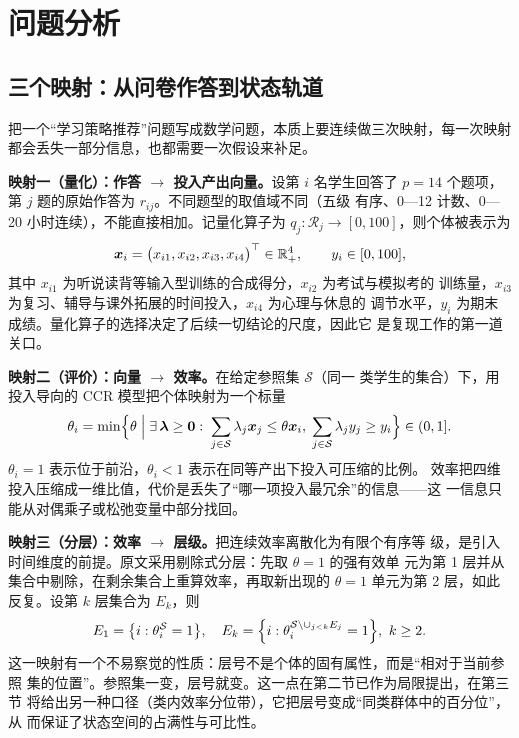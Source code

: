 \section{问题分析}

\subsection{三个映射：从问卷作答到状态轨道}

把一个“学习策略推荐”问题写成数学问题，本质上要连续做三次映射，每一次映射
都会丢失一部分信息，也都需要一次假设来补足。

\textbf{映射一（量化）：作答 $\to$ 投入产出向量。}设第 $i$ 名学生回答了
$p=14$ 个题项，第 $j$ 题的原始作答为 $r_{ij}$。不同题型的取值域不同（五级
有序、0—12 计数、0—20 小时连续），不能直接相加。记量化算子为
$q_j:\mathcal{R}_j\to[0,100]$，则个体被表示为
\begin{equation}
\bm{x}_i=\bigl(x_{i1},x_{i2},x_{i3},x_{i4}\bigr)^{\top}\in\mathbb{R}_+^4,\qquad
y_i\in[0,100],
\label{eq:map1}
\end{equation}
其中 $x_{i1}$ 为听说读背等输入型训练的合成得分，$x_{i2}$ 为考试与模拟考的
训练量，$x_{i3}$ 为复习、辅导与课外拓展的时间投入，$x_{i4}$ 为心理与休息的
调节水平，$y_i$ 为期末成绩。量化算子的选择决定了后续一切结论的尺度，因此它
是复现工作的第一道关口。

\textbf{映射二（评价）：向量 $\to$ 效率。}在给定参照集 $\mathcal{S}$（同一
类学生的集合）下，用投入导向的 CCR 模型把个体映射为一个标量
\begin{equation}
\theta_i=\min\Bigl\{\theta\;\Big|\;\exists\,\bm{\lambda}\ge \bm{0}:\;
\sum_{j\in\mathcal{S}}\lambda_j\bm{x}_j\le\theta\bm{x}_i,\;
\sum_{j\in\mathcal{S}}\lambda_j y_j\ge y_i\Bigr\}\in(0,1].
\label{eq:map2}
\end{equation}
$\theta_i=1$ 表示位于前沿，$\theta_i<1$ 表示在同等产出下投入可压缩的比例。
效率把四维投入压缩成一维比值，代价是丢失了“哪一项投入最冗余”的信息——这
一信息只能从对偶乘子或松弛变量中部分找回。

\textbf{映射三（分层）：效率 $\to$ 层级。}把连续效率离散化为有限个有序等
级，是引入时间维度的前提。原文采用剔除式分层：先取 $\theta=1$ 的强有效单
元为第 1 层并从集合中剔除，在剩余集合上重算效率，再取新出现的 $\theta=1$
单元为第 2 层，如此反复。设第 $k$ 层集合为 $E_k$，则
\begin{equation}
E_1=\bigl\{i:\theta_i^{\mathcal{S}}=1\bigr\},\quad
E_{k}=\Bigl\{i:\theta_i^{\mathcal{S}\setminus\cup_{j<k}E_j}=1\Bigr\},\ k\ge 2 .
\label{eq:map3}
\end{equation}
这一映射有一个不易察觉的性质：层号不是个体的固有属性，而是“相对于当前参照
集的位置”。参照集一变，层号就变。这一点在第二节已作为局限提出，在第三节
将给出另一种口径（类内效率分位带），它把层号变成“同类群体中的百分位”，从
而保证了状态空间的占满性与可比性。

